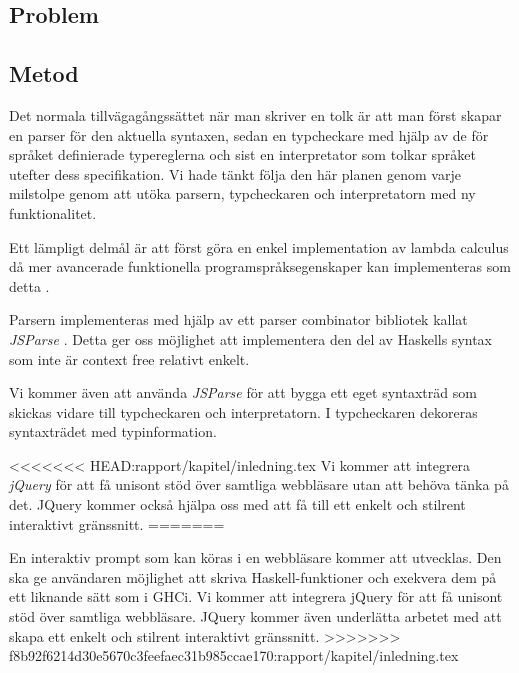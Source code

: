 \subsection{Problem} 

\subsection{Metod}
Det normala tillvägagångssättet när man skriver en tolk är att man först
skapar en parser för den aktuella syntaxen, sedan en typcheckare med 
hjälp av de för språket definierade typereglerna och sist en interpretator
som tolkar språket utefter dess specifikation. Vi hade tänkt följa den här planen genom varje milstolpe genom att utöka parsern, typcheckaren och interpretatorn med ny funktionalitet.

Ett lämpligt delmål är att först göra en enkel implementation av lambda calculus då mer avancerade funktionella programspråksegenskaper kan implementeras som detta \citep{jones87}.

 Parsern implementeras med hjälp av ett parser combinator bibliotek kallat \emph{JSParse} \citep{jsparse}. Detta ger oss möjlighet att implementera den del av Haskells syntax som inte är context free relativt enkelt.

Vi kommer även att använda \emph{JSParse} för att bygga ett eget syntaxträd som skickas vidare till typcheckaren och interpretatorn. I typcheckaren dekoreras syntaxträdet med typinformation.

<<<<<<< HEAD:rapport/kapitel/inledning.tex
Vi kommer att integrera \emph{jQuery} \citep{jquery} för att få unisont stöd över samtliga webbläsare utan att behöva tänka på det. JQuery kommer också hjälpa oss med att få till ett enkelt och stilrent interaktivt gränssnitt.
=======

En interaktiv prompt som kan köras i en webbläsare kommer att utvecklas. Den ska ge användaren möjlighet att skriva Haskell-funktioner och exekvera dem på ett liknande sätt som i GHCi. 
Vi kommer att integrera jQuery \citep{jquery} för att få unisont stöd över samtliga webbläsare. JQuery kommer även underlätta arbetet med att skapa ett enkelt och stilrent interaktivt gränssnitt.
>>>>>>> f8b92f6214d30e5670c3feefaec31b985ccae170:rapport/kapitel/inledning.tex

